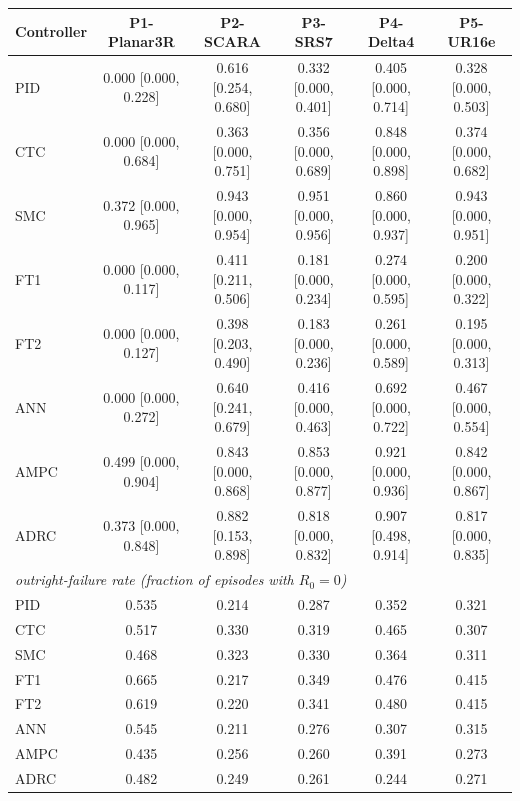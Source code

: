 \begin{tabular}{lccccc}
\toprule
Controller & P1-Planar3R & P2-SCARA & P3-SRS7 & P4-Delta4 & P5-UR16e \\
\midrule
PID & 0.000 [0.000, 0.228] & 0.616 [0.254, 0.680] & 0.332 [0.000, 0.401] & 0.405 [0.000, 0.714] & 0.328 [0.000, 0.503] \\
CTC & 0.000 [0.000, 0.684] & 0.363 [0.000, 0.751] & 0.356 [0.000, 0.689] & 0.848 [0.000, 0.898] & 0.374 [0.000, 0.682] \\
SMC & 0.372 [0.000, 0.965] & 0.943 [0.000, 0.954] & 0.951 [0.000, 0.956] & 0.860 [0.000, 0.937] & 0.943 [0.000, 0.951] \\
FT1 & 0.000 [0.000, 0.117] & 0.411 [0.211, 0.506] & 0.181 [0.000, 0.234] & 0.274 [0.000, 0.595] & 0.200 [0.000, 0.322] \\
FT2 & 0.000 [0.000, 0.127] & 0.398 [0.203, 0.490] & 0.183 [0.000, 0.236] & 0.261 [0.000, 0.589] & 0.195 [0.000, 0.313] \\
ANN & 0.000 [0.000, 0.272] & 0.640 [0.241, 0.679] & 0.416 [0.000, 0.463] & 0.692 [0.000, 0.722] & 0.467 [0.000, 0.554] \\
AMPC & 0.499 [0.000, 0.904] & 0.843 [0.000, 0.868] & 0.853 [0.000, 0.877] & 0.921 [0.000, 0.936] & 0.842 [0.000, 0.867] \\
ADRC & 0.373 [0.000, 0.848] & 0.882 [0.153, 0.898] & 0.818 [0.000, 0.832] & 0.907 [0.498, 0.914] & 0.817 [0.000, 0.835] \\
\midrule
\multicolumn{6}{l}{\itshape outright-failure rate (fraction of episodes with $R_0=0$)}\\
PID & 0.535 & 0.214 & 0.287 & 0.352 & 0.321 \\
CTC & 0.517 & 0.330 & 0.319 & 0.465 & 0.307 \\
SMC & 0.468 & 0.323 & 0.330 & 0.364 & 0.311 \\
FT1 & 0.665 & 0.217 & 0.349 & 0.476 & 0.415 \\
FT2 & 0.619 & 0.220 & 0.341 & 0.480 & 0.415 \\
ANN & 0.545 & 0.211 & 0.276 & 0.307 & 0.315 \\
AMPC & 0.435 & 0.256 & 0.260 & 0.391 & 0.273 \\
ADRC & 0.482 & 0.249 & 0.261 & 0.244 & 0.271 \\
\bottomrule
\end{tabular}

